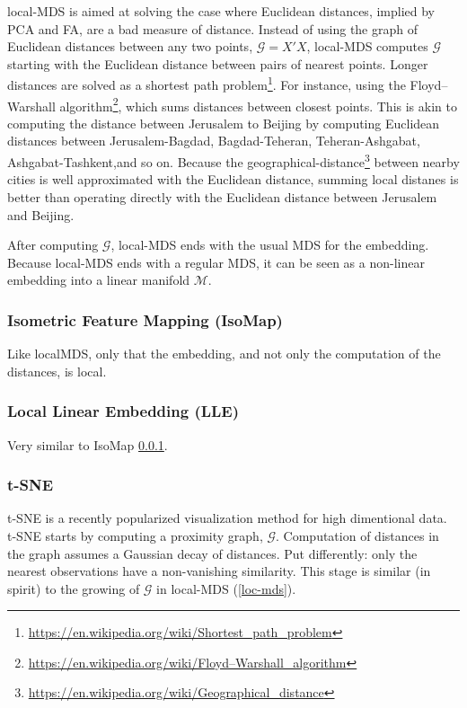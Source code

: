 \documentclass[]{book}
\renewcommand{\href}[2]{#2\footnote{\url{#1}}}
\theoremstyle{definition}
\theoremstyle{definition}
\theoremstyle{definition}
\theoremstyle{remark}
\begin{document}
local-MDS is aimed at solving the case where Euclidean distances, implied by PCA and FA, are a bad measure of distance.
Instead of using the graph of Euclidean distances between any two points, \(\mathcal{G}=X'X\), local-MDS computes \(\mathcal{G}\) starting with the Euclidean distance between pairs of nearest points.
Longer distances are solved as a \href{https://en.wikipedia.org/wiki/Shortest_path_problem}{shortest path problem}.
For instance, using the \href{https://en.wikipedia.org/wiki/Floyd–Warshall_algorithm}{Floyd--Warshall algorithm}, which sums distances between closest points.
This is akin to computing the distance between Jerusalem to Beijing by computing Euclidean distances between Jerusalem-Bagdad, Bagdad-Teheran, Teheran-Ashgabat, Ashgabat-Tashkent,and so on. Because the \href{https://en.wikipedia.org/wiki/Geographical_distance}{geographical-distance} between nearby cities is well approximated with the Euclidean distance, summing local distanes is better than operating directly with the Euclidean distance between Jerusalem and Beijing.

After computing \(\mathcal{G}\), local-MDS ends with the usual MDS for the embedding.
Because local-MDS ends with a regular MDS, it can be seen as a non-linear embedding into a linear manifold \(\mathcal{M}\).

\hypertarget{isomap}{%
\subsubsection{Isometric Feature Mapping (IsoMap)}\label{isomap}}

Like localMDS, only that the embedding, and not only the computation of the distances, is local.

\hypertarget{local-linear-embedding-lle}{%
\subsubsection{Local Linear Embedding (LLE)}\label{local-linear-embedding-lle}}

Very similar to IsoMap \ref{isomap}.

\hypertarget{t-sne}{%
\subsubsection{t-SNE}\label{t-sne}}

t-SNE is a recently popularized visualization method for high dimentional data.
t-SNE starts by computing a proximity graph, \(\mathcal{G}\).
Computation of distances in the graph assumes a Gaussian decay of distances.
Put differently: only the nearest observations have a non-vanishing similarity.
This stage is similar (in spirit) to the growing of \(\mathcal{G}\) in local-MDS (\ref{loc-mds}).
\end{document}
